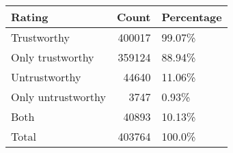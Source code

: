 \begin{tabular}{lrl}
\toprule
Rating & Count & Percentage \\
\midrule
Trustworthy & 400017 & 99.07\% \\
Only trustworthy & 359124 & 88.94\% \\
Untrustworthy & 44640 & 11.06\% \\
Only untrustworthy & 3747 & 0.93\% \\
Both & 40893 & 10.13\% \\
Total & 403764 & 100.0\% \\
\bottomrule
\end{tabular}
